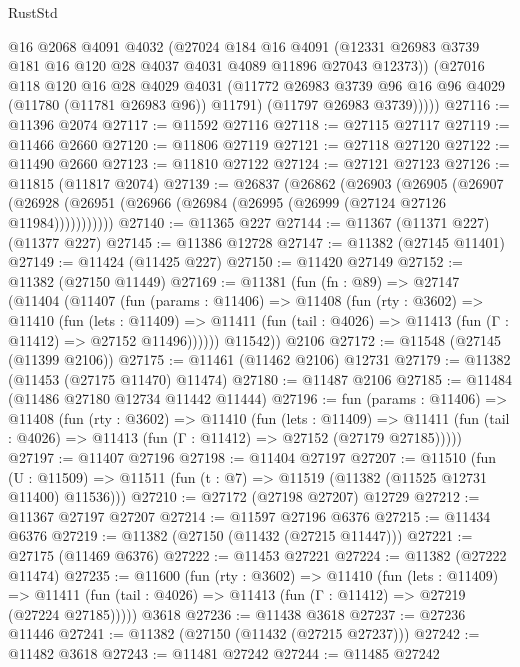 \begin{lexlean}{RustStd}
\begin{coremodule}
          @16
          @2068
          @4091
          @4032
          (@27024
            @184
            @16
            @4091
            (@12331 @26983 @3739 @181 @16 @120 @28 @4037 @4031 @4089 @11896 @27043 @12373))
          (@27016
            @118
            @120
            @16
            @28
            @4029
            @4031
            (@11772 @26983 @3739 @96 @16 @96 @4029 (@11780 (@11781 @26983 @96)) @11791)
            (@11797 @26983 @3739)))))
@27116 := @11396 @2074
@27117 := @11592 @27116
@27118 := @27115 @27117
@27119 := @11466 @2660
@27120 := @11806 @27119
@27121 := @27118 @27120
@27122 := @11490 @2660
@27123 := @11810 @27122
@27124 := @27121 @27123
@27126 := @11815 (@11817 @2074)
@27139 := @26837
    (@26862
      (@26903
        (@26905
          (@26907 (@26928 (@26951 (@26966 (@26984 (@26995 (@26999 (@27124 @27126 @11984)))))))))))
@27140 := @11365 @227
@27144 := @11367 (@11371 @227) (@11377 @227)
@27145 := @11386 @12728
@27147 := @11382 (@27145 @11401)
@27149 := @11424 (@11425 @227)
@27150 := @11420 @27149
@27152 := @11382 (@27150 @11449)
@27169 := @11381
    (fun (fn : @89) =>
    @27147
      (@11404
        (@11407
          (fun (params : @11406) =>
          @11408
            (fun (rty : @3602) =>
            @11410
              (fun (lets : @11409) =>
              @11411 (fun (tail : @4026) => @11413 (fun (Γ : @11412) => @27152 @11496))))))
        @11542))
    @2106
@27172 := @11548 (@27145 (@11399 @2106))
@27175 := @11461 (@11462 @2106) @12731
@27179 := @11382 (@11453 (@27175 @11470) @11474)
@27180 := @11487 @2106
@27185 := @11484 (@11486 @27180 @12734 @11442 @11444)
@27196 := fun (params : @11406) =>
  @11408
    (fun (rty : @3602) =>
    @11410
      (fun (lets : @11409) =>
      @11411 (fun (tail : @4026) => @11413 (fun (Γ : @11412) => @27152 (@27179 @27185)))))
@27197 := @11407 @27196
@27198 := @11404 @27197
@27207 := @11510
    (fun (U : @11509) => @11511 (fun (t : @7) => @11519 (@11382 (@11525 @12731 @11400) @11536)))
@27210 := @27172 (@27198 @27207) @12729
@27212 := @11367 @27197 @27207
@27214 := @11597 @27196 @6376
@27215 := @11434 @6376
@27219 := @11382 (@27150 (@11432 (@27215 @11447)))
@27221 := @27175 (@11469 @6376)
@27222 := @11453 @27221
@27224 := @11382 (@27222 @11474)
@27235 := @11600
    (fun (rty : @3602) =>
    @11410
      (fun (lets : @11409) =>
      @11411 (fun (tail : @4026) => @11413 (fun (Γ : @11412) => @27219 (@27224 @27185)))))
    @3618
@27236 := @11438 @3618
@27237 := @27236 @11446
@27241 := @11382 (@27150 (@11432 (@27215 @27237)))
@27242 := @11482 @3618
@27243 := @11481 @27242
@27244 := @11485 @27242

\end{coremodule}
\end{lexlean}
